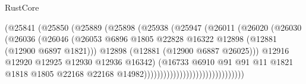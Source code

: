 \begin{lexlean}{RustCore}
\begin{coremodule}
                                              (@25841
                                                (@25850
                                                  (@25889
                                                    (@25898
                                                      (@25938
                                                        (@25947
                                                          (@26011
                                                            (@26020
                                                              (@26030
                                                                (@26036
                                                                  (@26046
                                                                    (@26053
                                                                      @6896
                                                                      @1805
                                                                      @22828
                                                                      @16322
                                                                      @12898
                                                                      (@12881 (@12900 @6897 @1821)))
                                                                    @12898
                                                                    (@12881 (@12900 @6887 @26025)))
                                                                  @12916
                                                                  @12920
                                                                  @12925
                                                                  @12930
                                                                  @12936
                                                                  @16342)
                                                                (@16733
                                                                  @6910
                                                                  @91
                                                                  @91
                                                                  @11
                                                                  @1821
                                                                  @1818
                                                                  @1805
                                                                  @22168
                                                                  @22168
                                                                  @14982)))))))))))))))))))))))))))))))

\end{coremodule}
\end{lexlean}
